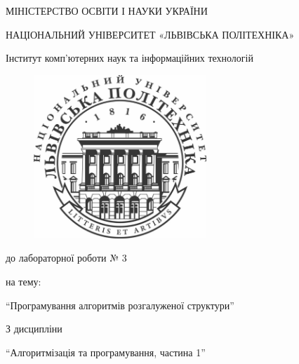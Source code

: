 \documentclass{article}
\begin{document}
\pagestyle{empty}
\begin{center}

	{\fontsize{14}{24}\selectfont МІНІСТЕРСТВО ОСВІТИ І НАУКИ УКРАЇНИ

	НАЦІОНАЛЬНИЙ УНІВЕРСИТЕТ «ЛЬВІВСЬКА ПОЛІТЕХНІКА»

	Інститут комп'ютерних наук та інформаційних технологій

	}

	\vspace{90.4pt} %
	\begin{figure}[h]
		\centering
		\includegraphics[width=6.5cm,keepaspectratio]{../../../lpnu.png}
	\end{figure}

	{\fontsize{18}{29}\selectfont{Звіт}

	{до лабораторної роботи № 3}

	{на тему:}

	{``Програмування алгоритмів розгалуженої структури''}

	{З дисципліни}

	{``Алгоритмізація та програмування, частина 1''}

	}
\end{center}
\end{document}

